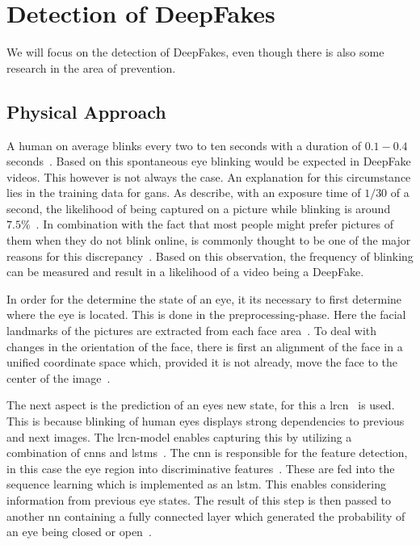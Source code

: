 \section{Detection of DeepFakes}
We will focus on the detection of DeepFakes, even though there is also some 
research in the area of prevention.

\subsection{Physical Approach}
A human on average blinks every two to ten seconds with a duration of \(0.1-0.4\)
seconds~\cite{li_ictu_2018}. Based on this spontaneous eye blinking would be
expected in DeepFake videos. This however is not always the case. An explanation
for this circumstance lies in the training data for \glspl{gan}. As 
\textcite{li_ictu_2018} describe, with an exposure time of \(1/30\) of a second,
the likelihood of being captured on a picture while blinking is around \(7.5\%\)~\cite{li_ictu_2018}.
In combination with the fact that most people might prefer pictures of them when
they do not blink online, is commonly thought to be one of the major reasons for
this discrepancy~\cite{pishori_detecting_2020}. Based on this observation, the
frequency of blinking can be measured and result in a likelihood of a video being
a DeepFake.

\par
In order for the determine the state of an eye, it its necessary to first determine
where the eye is located. This is done in the preprocessing-phase. Here the facial
landmarks of the pictures are extracted from each face area~\cite{li_ictu_2018}.
To deal with changes in the orientation of the face, there is first an alignment
of the face in a unified coordinate space which, provided it is not already,
move the face to the center of the image~\cite{li_ictu_2018}.

\par
The next aspect is the prediction of an eyes new state, for this a \gls{lrcn}~\cite{donahue_long-term_2014}
is used. This is because blinking of human eyes displays strong dependencies to
previous and next images. The \gls{lrcn}-model enables capturing this by utilizing
a combination of \glspl{cnn} and \glspl{lstm}~\cite{donahue_long-term_2014}.
The \gls{cnn} is responsible for the feature detection, in this case the eye
region into discriminative features~\cite{li_ictu_2018,donahue_long-term_2014}. 
These are fed into the sequence learning which is implemented as an \gls{lstm}.
This enables considering information from previous eye states. The result of
this step is then passed to another \gls{nn} containing a fully connected layer
which generated the probability of an eye being closed or open~\cite{li_ictu_2018}.

